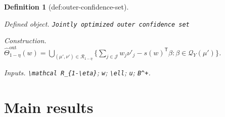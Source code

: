 \documentclass{article}
\newtheorem{definition}{Definition}
\begin{document}
\begin{definition}[def:outer-confidence-set]\label{def:outer-confidence-set}
\par\smallskip\noindent\emph{Defined object.} \texttt{Jointly optimized outer confidence set}
\par\smallskip\noindent\emph{Construction.} \(\widehat\Theta^{\mathrm{out}}_{1-\eta}(w)=\bigcup_{(\mu',\nu')\in\mathcal R_{1-\eta}}\{\sum_{j\in\mathcal J}w_j\nu'_j-s(w)^{\mathsf T}\beta:\beta\in\mathcal Q_Y(\mu')\}\).
\par\smallskip\noindent\emph{Inputs.} \texttt{\textbackslash{}\allowbreak{}mathcal R\_\allowbreak{}\{1-\allowbreak{}\textbackslash{}\allowbreak{}eta\}\allowbreak{}}; \texttt{w}; \texttt{\textbackslash{}\allowbreak{}ell}; \texttt{u}; \texttt{B\textasciicircum{}+\allowbreak{}}.
\end{definition}

\section{Main results}
\end{document}
